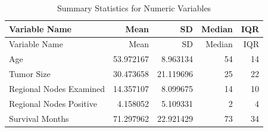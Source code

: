 \documentclass[
]{article}
\begin{document}
\begin{longtable}[]{@{}lrrrr@{}}
\caption{Summary Statistics for Numeric Variables}\tabularnewline
\toprule\noalign{}
Variable Name & Mean & SD & Median & IQR \\
\midrule\noalign{}
\endfirsthead
\toprule\noalign{}
Variable Name & Mean & SD & Median & IQR \\
\midrule\noalign{}
\endhead
\bottomrule\noalign{}
\endlastfoot
Age & 53.972167 & 8.963134 & 54 & 14 \\
Tumor Size & 30.473658 & 21.119696 & 25 & 22 \\
Regional Nodes Examined & 14.357107 & 8.099675 & 14 & 10 \\
Regional Nodes Positive & 4.158052 & 5.109331 & 2 & 4 \\
Survival Months & 71.297962 & 22.921429 & 73 & 34 \\
\end{longtable}
\end{document}
